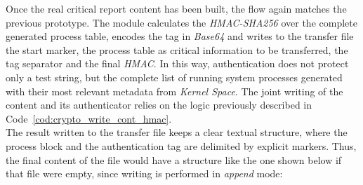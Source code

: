 Once the real critical report content has been built, the flow again matches the previous prototype.
The module calculates the \textit{HMAC-SHA256} over the complete generated process table, encodes the tag in \textit{Base64} and writes to the transfer file the start marker, the process table as critical information to be transferred, the tag separator and the final \textit{HMAC}.
In this way, authentication does not protect only a test string, but the complete list of running system processes generated with their most relevant metadata from \textit{Kernel Space}.
The joint writing of the content and its authenticator relies on the logic previously described in Code~\ref{cod:crypto_write_cont_hmac}.\\

The result written to the transfer file keeps a clear textual structure, where the process block and the authentication tag are delimited by explicit markers.
Thus, the final content of the file would have a structure like the one shown below if that file were empty, since writing is performed in \textit{append} mode:
